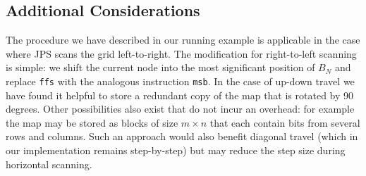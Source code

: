 \subsection*{Additional Considerations}
The procedure we have described in our running example is applicable in the case
where JPS scans the grid left-to-right. The modification for right-to-left
scanning is simple: we shift the current node into the most significant position
of $B_N$ and replace \texttt{ffs} with the analogous instruction \texttt{msb}.  In the case
of up-down travel we have found it helpful to store a redundant copy of the
map that is rotated by 90 degrees. Other possibilities also exist that do not
incur an overhead: for example the map may be stored as blocks of size $m
\times n$ that each contain bits from several rows and columns. Such an
approach would also benefit diagonal travel (which in our implementation
remains step-by-step) but may reduce the step size during horizontal scanning.
%
%
%
%
%

